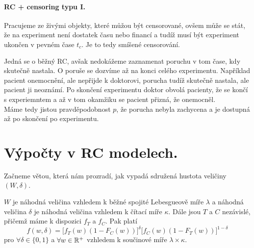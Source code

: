     \paragraph{RC + censoring typu I.}
    Pracujeme ze živými objekty, které můžou být censorované, ovšem může se stát, že na experiment není dostatek času nebo financí a tudíž musí být experiment ukončen v pevném čase $t_{c}$. Je to tedy smíšené censorování.
    
    \begin{remark}
    Jedná se o běžný RC, avšak nedokážeme zaznamenat poruchu v tom čase, kdy skutečně nastala. O poruše se dozvíme až na konci celého experimentu. Například pacient onemocnění, ale nepřijde k doktorovi, porucha tudíž skutečně nastala, ale pacient ji neoznámí. Po skončení experimentu doktor obvolá pacienty, že se končí s experiemntem a až v tom okamžiku se pacient přizná, že onemocněl.\\
    Máme tedy jistou pravděpodobnost $p$, že porucha nebyla zachycena a je dostupná až po skončení po experimentu.
    \end{remark}
    
    \section{Výpočty v RC modelech.}
    Začneme větou, která nám prozradí, jak vypadá sdružená hustota veličiny $(W, \delta)$.
    \begin{theorem}
        $W$ je náhodná veličina vzhledem k běžné spojité Lebesgueově míře $\lambda$ a náhodná veličina $\delta$ je náhodná veličina vzhledem k čítací míře $\kappa$. Dále jsou $T$ a $C$ nezávislé, přičemž máme k dispozici $f_T$ a $f_C$. Pak platí
        $$f(w,\delta) =  \Big[f_T(w)(1-F_C(w))\Big] ^{\delta}\Big[f_C(w)(1-F_T(w)) \Big]^{1-\delta}$$
        pro $\forall \delta\in\lbrace 0,1\rbrace$ a $\forall w\in\mathbb{R}^{+}$ vzhledem k součinové míře $\lambda \times \kappa$.
    \end{theorem}

